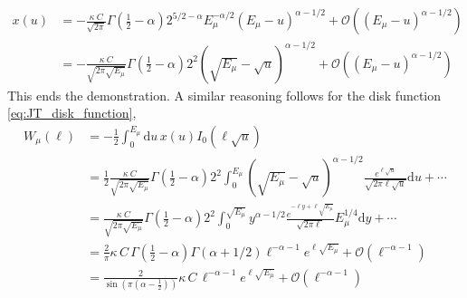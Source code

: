 \documentclass[a4paper,11pt]{article}
\begin{document}
\begin{align}
    x(u)&= -\frac{\kappa \ C}{\sqrt{2\pi}}\Gamma\left(\frac{1}{2}-\alpha\right) 2^{5/2-\alpha} E_\mu^{-\alpha/2} (E_\mu-u)^{\alpha-1/2}+\mathcal{O}((E_\mu-u)^{\alpha - 1/2})\\
    &=-\frac{\kappa \ C}{\sqrt{2\pi\sqrt{E_\mu}}}\Gamma\left(\frac{1}{2}-\alpha\right) 2^{2} (\sqrt{E_\mu}-\sqrt{u})^{\alpha-1/2}+\mathcal{O}((E_\mu-u)^{\alpha - 1/2})
\end{align}
This ends the demonstration. A similar reasoning follows for the disk function \eqref{eq:JT_disk_function}, 
\begin{align}
    W_\mu(\ell) &= -\frac{1}{2}\int_0^{E_\mu} \mathrm{d}u \,x(u) I_0(\ell\sqrt{u})\\
    &= \frac{1}{2} \frac{\kappa \ C}{\sqrt{2\pi\sqrt{E_\mu}}}\Gamma\left(\frac{1}{2}-\alpha\right) 2^{2} \int_0^{E_\mu} (\sqrt{E_\mu}-\sqrt{u})^{\alpha-1/2} \frac{e^{\ell \sqrt{u}}}{\sqrt{2\pi \ell\sqrt{u}}} \mathrm{d}u+ \cdots\\
    &=  \frac{\kappa \ C}{\sqrt{2\pi\sqrt{E_\mu}}}\Gamma\left(\frac{1}{2}-\alpha\right) 2^{2} \int_0^{\sqrt{E_\mu}} y^{\alpha-1/2} \frac{e^{-\ell y +\ell \sqrt{E_\mu}}}{\sqrt{2\pi \ell}}E_\mu^{1/4}\mathrm{d}y+ \cdots\\
    &= \frac{2}{\pi}\kappa \, C \, \Gamma\left(\frac{1}{2}-\alpha\right) \Gamma(\alpha + 1/2) \ell^{-\alpha-1}e^{\ell \sqrt{E_\mu}} + \mathcal{O}(\ell^{-\alpha-1})\\
     &= \frac{2}{\sin\left(\pi\left(\alpha-\frac{1}{2}\right)\right)}\kappa \, C \,  \ell^{-\alpha-1}e^{\ell \sqrt{E_\mu}} + \mathcal{O}(\ell^{-\alpha-1})\label{eq:disk_non-gen-crit}
\end{align}
\end{document}
